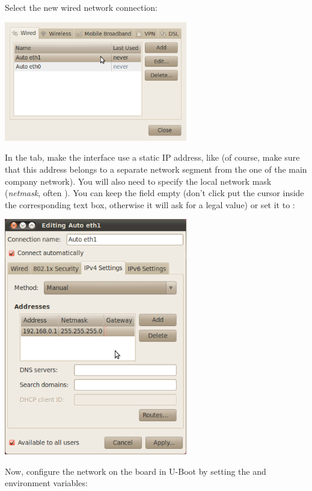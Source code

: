Select the new wired network connection:

\begin{center}
\includegraphics[width=8cm]{labs/kernel-module-environment/network-config-2.png}
\end{center}

In the  tab, make the interface use a static IP
address, like  (of course, make sure that this address
belongs to a separate network segment from the one of the main company
network). You will also need to specify the local network mask
(\emph{netmask}, often ). You can keep the
 field empty (don't click put the cursor inside the
corresponding text box, otherwise it will ask for a legal value)
or set it to :

\begin{center}
\includegraphics[width=8cm]{labs/kernel-module-environment/network-config-3.png}
\end{center}

Now, configure the network on the board in U-Boot by setting the
 and  environment variables:

